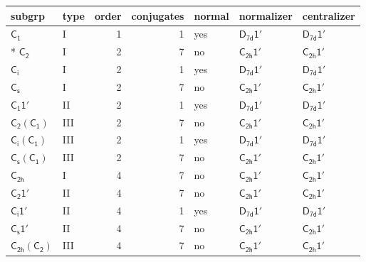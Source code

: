 \documentclass[10pt,a4paper]{article}
\numberwithin{equation}{section}
\newcommand{\grp}[1]{\mathsf{#1}}
\begin{document}
{\small\begin{longtable}{@{}llrrlll@{}}\toprule
subgrp & type & order & conjugates & normal & normalizer & centralizer\\\midrule\endhead
\bottomrule\endfoot\endlastfoot
\href{../../../rotation/data/pdf/C1.pdf}{$\grp{C_{1}}$} & I & 1 & 1 & yes & \href{D7d-1p.pdf}{$\grp{D_{7d}1'}$} & \href{D7d-1p.pdf}{$\grp{D_{7d}1'}$}\\*
\href{../../../rotation/data/pdf/C2.pdf}{$\grp{C_{2}}$} & I & 2 & 7 & no & \href{C2h-1p.pdf}{$\grp{C_{2h}1'}$} & \href{C2h-1p.pdf}{$\grp{C_{2h}1'}$}\\
\href{../../../rotation/data/pdf/S2.pdf}{$\grp{C_{i}}$} & I & 2 & 1 & yes & \href{D7d-1p.pdf}{$\grp{D_{7d}1'}$} & \href{D7d-1p.pdf}{$\grp{D_{7d}1'}$}\\
\href{../../../rotation/data/pdf/C1v.pdf}{$\grp{C_{s}}$} & I & 2 & 7 & no & \href{C2h-1p.pdf}{$\grp{C_{2h}1'}$} & \href{C2h-1p.pdf}{$\grp{C_{2h}1'}$}\\
\href{C1-1p.pdf}{$\grp{C_{1}1'}$} & II & 2 & 1 & yes & \href{D7d-1p.pdf}{$\grp{D_{7d}1'}$} & \href{D7d-1p.pdf}{$\grp{D_{7d}1'}$}\\
\href{C2-C1.pdf}{$\grp{C_{2}}(\grp{C_{1}})$} & III & 2 & 7 & no & \href{C2h-1p.pdf}{$\grp{C_{2h}1'}$} & \href{C2h-1p.pdf}{$\grp{C_{2h}1'}$}\\
\href{S2-C1.pdf}{$\grp{C_{i}}(\grp{C_{1}})$} & III & 2 & 1 & yes & \href{D7d-1p.pdf}{$\grp{D_{7d}1'}$} & \href{D7d-1p.pdf}{$\grp{D_{7d}1'}$}\\
\href{C1v-C1.pdf}{$\grp{C_{s}}(\grp{C_{1}})$} & III & 2 & 7 & no & \href{C2h-1p.pdf}{$\grp{C_{2h}1'}$} & \href{C2h-1p.pdf}{$\grp{C_{2h}1'}$}\\
\href{../../../rotation/data/pdf/C2h.pdf}{$\grp{C_{2h}}$} & I & 4 & 7 & no & \href{C2h-1p.pdf}{$\grp{C_{2h}1'}$} & \href{C2h-1p.pdf}{$\grp{C_{2h}1'}$}\\
\href{C2-1p.pdf}{$\grp{C_{2}1'}$} & II & 4 & 7 & no & \href{C2h-1p.pdf}{$\grp{C_{2h}1'}$} & \href{C2h-1p.pdf}{$\grp{C_{2h}1'}$}\\
\href{S2-1p.pdf}{$\grp{C_{i}1'}$} & II & 4 & 1 & yes & \href{D7d-1p.pdf}{$\grp{D_{7d}1'}$} & \href{D7d-1p.pdf}{$\grp{D_{7d}1'}$}\\
\href{C1v-1p.pdf}{$\grp{C_{s}1'}$} & II & 4 & 7 & no & \href{C2h-1p.pdf}{$\grp{C_{2h}1'}$} & \href{C2h-1p.pdf}{$\grp{C_{2h}1'}$}\\
\href{C2h-C2.pdf}{$\grp{C_{2h}}(\grp{C_{2}})$} & III & 4 & 7 & no & \href{C2h-1p.pdf}{$\grp{C_{2h}1'}$} & \href{C2h-1p.pdf}{$\grp{C_{2h}1'}$}\\

\end{longtable}}
\end{document}
